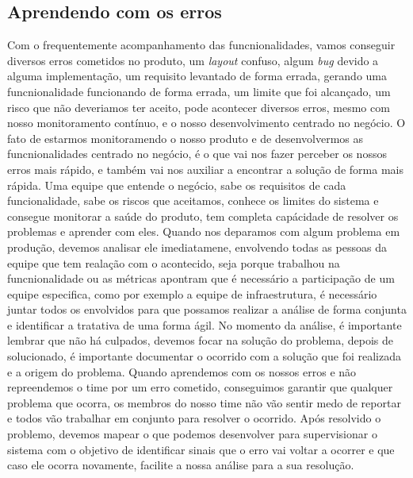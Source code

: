     \subsection{Aprendendo com os erros}
    Com o frequentemente acompanhamento das funcnionalidades, vamos conseguir
    diversos erros cometidos no produto, um \textit{layout} confuso, algum
    \textit{bug} devido a alguma implementação, um requisito levantado de
    forma errada, gerando uma funcnionalidade funcionando de forma errada, um
    limite que foi alcançado, um risco que não deveriamos ter aceito, pode
    acontecer diversos erros, mesmo com nosso monitoramento contínuo, e o nosso
    desenvolvimento centrado no negócio. O fato de estarmos monitoramendo o nosso
    produto e de desenvolvermos as funcnionalidades centrado no negócio, é o que
    vai nos fazer perceber os nossos erros mais rápido, e também vai nos auxiliar
    a encontrar a solução de forma mais rápida. Uma equipe que entende o negócio,
    sabe os requisitos de cada funcionalidade, sabe os riscos que aceitamos,
    conhece os limites do sistema e consegue monitorar a saúde do produto, tem
    completa capácidade de resolver os problemas e aprender com eles. \newline
    Quando nos deparamos com algum problema em produção, devemos analisar ele
    imediatamene, envolvendo todas as pessoas da equipe que tem realação com o
    acontecido, seja porque trabalhou na funcnionalidade ou as métricas apontram
    que é necessário a participação de um equipe especifica, como por exemplo a
    equipe de infraestrutura, é necessário juntar todos os envolvidos para que
    possamos realizar a análise de forma conjunta e identificar a tratativa de
    uma forma ágil. No momento da análise, é importante lembrar que não há
    culpados, devemos focar na solução do problema, depois de solucionado, é
    importante documentar o ocorrido com a solução que foi realizada e a origem
    do problema. Quando aprendemos com os nossos erros e não repreendemos o
    time por um erro cometido, conseguimos garantir que qualquer problema que
    ocorra, os membros do nosso time não vão sentir medo de reportar e todos vão
    trabalhar em conjunto para resolver o ocorrido. Após resolvido o problemo,
    devemos mapear o que podemos desenvolver para supervisionar o sistema com o
    objetivo de identificar sinais que o erro vai voltar a ocorrer e que caso
    ele ocorra novamente, facilite a nossa análise para a sua resolução. \newline

